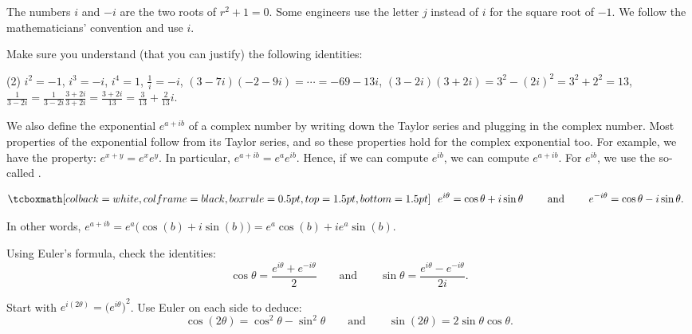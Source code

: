 The numbers
$i$ and $-i$ are the two roots of $r^2 + 1 = 0$.
Some engineers use the letter $j$ instead of $i$ for the square
root of $-1$.  We follow the mathematicians' convention and use $i$.

\begin{exercise}
Make sure you understand (that you can justify)
the following identities:
\begin{tasks}(2)
\task $i^2 = -1$, $i^3 = -i$, $i^4 = 1$,
\task $\frac{1}{i} = -i$,
\task $(3-7i)(-2-9i) = \cdots = -69-13i$,
\task $(3-2i)(3+2i) = 3^2 - {(2i)}^2 = 3^2 + 2^2 = 13$,
\task $\frac{1}{3-2i} = \frac{1}{3-2i} \frac{3+2i}{3+2i} = \frac{3+2i}{13}
= \frac{3}{13}+\frac{2}{13}i$.
\end{tasks}
\end{exercise}

\pagebreak[2]
We also define the exponential $e^{a+ib}$ of a complex number
by writing down the Taylor series and plugging in the complex
number.  Most properties of the exponential follow
from its
Taylor series, and so these
properties hold for the complex
exponential too.
For example, we have the property:
$e^{x+y} = e^x e^y$.  In particular,
$e^{a+ib} = e^a e^{ib}$.  Hence, if we can compute $e^{ib}$, we can
compute $e^{a+ib}$.  For $e^{ib}$, we use the so-called
\emph{}.

\begin{theorem} \label{eulersformula}
\begin{equation*}
\mybxbg{~~
e^{i \theta} = \cos \theta + i \sin \theta
\qquad \text{ and } \qquad
e^{- i \theta} = \cos \theta - i \sin \theta .
~~}
\end{equation*}
\end{theorem}

In other words, $e^{a+ib} = e^a \bigl( \cos(b) + i \sin(b) \bigr) = e^a \cos(b) + i e^a \sin(b)$.

\begin{exercise}
Using Euler's formula, check the identities:
\begin{equation*}
\cos \theta = \frac{e^{i \theta} + e^{-i \theta}}{2}
\qquad \text{and} \qquad
\sin \theta = \frac{e^{i \theta} - e^{-i \theta}}{2i}.
\end{equation*}
\end{exercise}

\begin{exercise}
Start with $e^{i(2\theta)} = {\bigl(e^{i \theta} \bigr)}^2$.  Use Euler on
each side to deduce:
\begin{equation*}
\cos (2\theta) = \cos^2 \theta - \sin^2 \theta
\qquad \text{and} \qquad
\sin (2\theta) = 2 \sin \theta \cos \theta .
\end{equation*}
\end{exercise}

